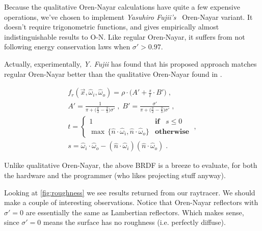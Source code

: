 \documentclass[a4paper, twocolumn]{article}
\begin{document}
                Because the qualitative Oren-Nayar calculations have quite a few expensive operations, we've chosen to implement \emph{Yasuhiro Fujii's}~\cite{fujii2015improvement} Oren-Nayar variant. It doesn't require trigonometric functions, and gives empirically almost indistinguishable results to O-N. Like regular Oren-Nayar, it suffers from not following energy conservation laws when \(\sigma' > 0.97\).

                Actually, experimentally, \emph{Y. Fujii} has found that his proposed approach matches regular Oren-Nayar better than the qualitative Oren-Nayar found in \cite{oren1994generalization}.

                \vspace{-1em}

                \begin{equation} \label{eq:improved_oren-nayar_model}
                    \begin{split}
                        f_r(\vec{x}, \hat{\omega}_i, \hat{\omega}_o) = \rho \cdot \Big(A' + \frac{s}{t} \cdot B'\Big) \; ,\\
                        A' = \frac{1}{\pi + \big(\frac{\pi}{2} - \frac{2}{3}\big) \sigma'} \; , \; B' = \frac{\sigma'}{\pi + \big(\frac{\pi}{2} - \frac{2}{3}\big) \sigma'} \; ,\\
                        t = \begin{cases}
                            1 & \textbf{if}\;\;\; s \leq 0\\
                            \max\, \{\hat{n} \cdot \hat{\omega}_i, \hat{n} \cdot \hat{\omega}_o\} & \textbf{otherwise}
                        \end{cases} \; ,\\
                        s = \hat{\omega}_i \cdot \hat{\omega}_o - (\hat{n} \cdot \hat{\omega}_i)(\hat{n} \cdot \hat{\omega}_o) \; .
                    \end{split}
                \end{equation}

                Unlike qualitative Oren-Nayar, the above BRDF is a breeze to evaluate, for both the hardware and the programmer (who likes projecting stuff anyway).

                Looking at \cref{fig:roughness} we see results returned from our raytracer. We should make a couple of interesting observations. Notice that Oren-Nayar reflectors with \(\sigma' = 0\) are essentially the same as Lambertian reflectors. Which makes sense, since \(\sigma' = 0\) means the surface has no roughness (i.e. perfectly diffuse).
\end{document}
